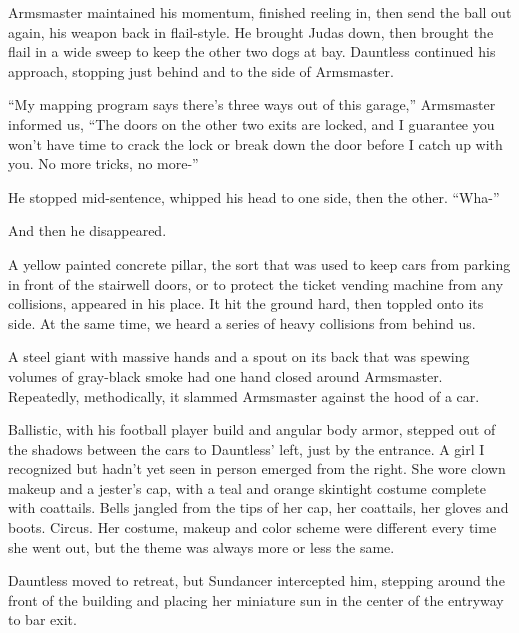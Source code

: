 Armsmaster maintained his momentum, finished reeling in, then send the ball out again, his weapon back in flail-style.  He brought Judas down, then brought the flail in a wide sweep to keep the other two dogs at bay.  Dauntless continued his approach, stopping just behind and to the side of Armsmaster.



``My mapping program says there's three ways out of this garage,'' Armsmaster informed us, ``The doors on the other two exits are locked, and I guarantee you won't have time to crack the lock or break down the door before I catch up with you.  No more tricks, no more-''



He stopped mid-sentence, whipped his head to one side, then the other.  ``Wha-''



And then he disappeared.



A yellow painted concrete pillar, the sort that was used to keep cars from parking in front of the stairwell doors, or to protect the ticket vending machine from any collisions, appeared in his place.  It hit the ground hard, then toppled onto its side.  At the same time, we heard a series of heavy collisions from behind us.



A steel giant with massive hands and a spout on its back that was spewing volumes of gray-black smoke had one hand closed around Armsmaster.  Repeatedly, methodically, it slammed Armsmaster against the hood of a car.



Ballistic, with his football player build and angular body armor, stepped out of the shadows between the cars to Dauntless' left, just by the entrance.  A girl I recognized but hadn't yet seen in person emerged from the right.  She wore clown makeup and a jester's cap, with a teal and orange skintight costume complete with coattails.  Bells jangled from the tips of her cap, her coattails, her gloves and boots.  Circus.  Her costume, makeup and color scheme were different every time she went out, but the theme was always more or less the same.



Dauntless moved to retreat, but Sundancer intercepted him, stepping around the front of the building and placing her miniature sun in the center of the entryway to bar exit.



